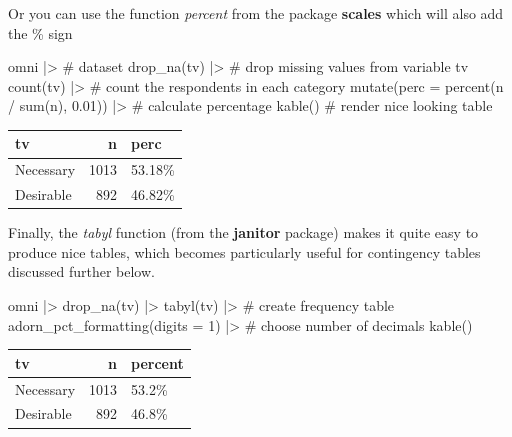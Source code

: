 \documentclass[
  letterpaper,
  DIV=11,
  numbers=noendperiod]{scrreprt}
\newenvironment{Shaded}{\begin{snugshade}}{\end{snugshade}}
\newcommand{\AttributeTok}[1]{\textcolor[rgb]{0.40,0.45,0.13}{#1}}
\newcommand{\CommentTok}[1]{\textcolor[rgb]{0.37,0.37,0.37}{#1}}
\newcommand{\DecValTok}[1]{\textcolor[rgb]{0.68,0.00,0.00}{#1}}
\newcommand{\FloatTok}[1]{\textcolor[rgb]{0.68,0.00,0.00}{#1}}
\newcommand{\FunctionTok}[1]{\textcolor[rgb]{0.28,0.35,0.67}{#1}}
\newcommand{\NormalTok}[1]{\textcolor[rgb]{0.00,0.23,0.31}{#1}}
\newcommand{\SpecialCharTok}[1]{\textcolor[rgb]{0.37,0.37,0.37}{#1}}
\newcounter{none} %
\begin{document}
Or you can use the function \emph{percent} from the package
\textbf{scales} which will also add the \% sign

\begin{Shaded}
\begin{Highlighting}[]
\NormalTok{omni }\SpecialCharTok{|\textgreater{}} \CommentTok{\# dataset}
  \FunctionTok{drop\_na}\NormalTok{(tv) }\SpecialCharTok{|\textgreater{}} \CommentTok{\# drop missing values from variable tv}
  \FunctionTok{count}\NormalTok{(tv) }\SpecialCharTok{|\textgreater{}} \CommentTok{\# count the respondents in each category}
  \FunctionTok{mutate}\NormalTok{(}\AttributeTok{perc =} \FunctionTok{percent}\NormalTok{(n }\SpecialCharTok{/} \FunctionTok{sum}\NormalTok{(n), }\FloatTok{0.01}\NormalTok{)) }\SpecialCharTok{|\textgreater{}} \CommentTok{\# calculate percentage}
  \FunctionTok{kable}\NormalTok{() }\CommentTok{\# render nice looking table}
\end{Highlighting}
\end{Shaded}

{\def\LTcaptype{none} %
\begin{longtable}[]{@{}lrl@{}}
\toprule\noalign{}
tv & n & perc \\
\midrule\noalign{}
\endhead
\bottomrule\noalign{}
\endlastfoot
Necessary & 1013 & 53.18\% \\
Desirable & 892 & 46.82\% \\
\end{longtable}
}

Finally, the \emph{tabyl} function (from the \textbf{janitor} package)
makes it quite easy to produce nice tables, which becomes particularly
useful for contingency tables discussed further below.

\begin{Shaded}
\begin{Highlighting}[]
\NormalTok{omni }\SpecialCharTok{|\textgreater{}} 
  \FunctionTok{drop\_na}\NormalTok{(tv) }\SpecialCharTok{|\textgreater{}} 
  \FunctionTok{tabyl}\NormalTok{(tv) }\SpecialCharTok{|\textgreater{}} \CommentTok{\# create frequency table}
  \FunctionTok{adorn\_pct\_formatting}\NormalTok{(}\AttributeTok{digits =} \DecValTok{1}\NormalTok{) }\SpecialCharTok{|\textgreater{}} \CommentTok{\# choose number of decimals}
  \FunctionTok{kable}\NormalTok{()}
\end{Highlighting}
\end{Shaded}

{\def\LTcaptype{none} %
\begin{longtable}[]{@{}lrl@{}}
\toprule\noalign{}
tv & n & percent \\
\midrule\noalign{}
\endhead
\bottomrule\noalign{}
\endlastfoot
Necessary & 1013 & 53.2\% \\
Desirable & 892 & 46.8\% \\
\end{longtable}
}
\end{document}
